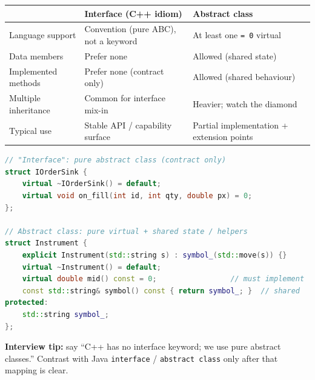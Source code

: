 \begin{table}[H]
\centering
\small
\begin{tabular}{|p{}|p{}|p{}|}
\hline
 & \textbf{Interface (C++ idiom)} & \textbf{Abstract class} \\
\hline
Language support &
  Convention (pure ABC), not a keyword &
  At least one \texttt{= 0} virtual \\
\hline
Data members &
  Prefer none &
  Allowed (shared state) \\
\hline
Implemented methods &
  Prefer none (contract only) &
  Allowed (shared behaviour) \\
\hline
Multiple inheritance &
  Common for interface mix-in &
  Heavier; watch the diamond \\
\hline
Typical use &
  Stable API / capability surface &
  Partial implementation + extension points \\
\hline
\end{tabular}
\end{table}

\begin{lstlisting}[language=C++]
// "Interface": pure abstract class (contract only)
struct IOrderSink {
    virtual ~IOrderSink() = default;
    virtual void on_fill(int id, int qty, double px) = 0;
};

// Abstract class: pure virtual + shared state / helpers
struct Instrument {
    explicit Instrument(std::string s) : symbol_(std::move(s)) {}
    virtual ~Instrument() = default;
    virtual double mid() const = 0;                 // must implement
    const std::string& symbol() const { return symbol_; }  // shared
protected:
    std::string symbol_;
};
\end{lstlisting}

\par\noindent\textbf{Interview tip:} say ``C++ has no interface keyword; we use 
pure abstract classes.'' Contrast with Java \texttt{interface} / 
\texttt{abstract class} only after that mapping is clear.
